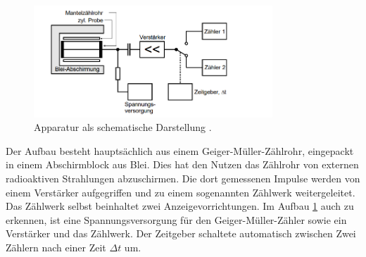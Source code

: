 \begin{figure}
  \centering
  \includegraphics[width=0.8\textwidth]{bilder/Schematische Darstellung des Versuchsaufbaus.png}
  \caption{Apparatur als schematische Darstellung \cite{skript}.}
  \label{fig:aufbau}
\end{figure}
Der Aufbau besteht hauptsächlich aus einem Geiger-Müller-Zählrohr, eingepackt in einem Abschirmblock aus Blei. Dies hat den Nutzen das Zählrohr von externen 
radioaktiven Strahlungen abzuschirmen. Die dort gemessenen Impulse werden von einem Verstärker aufgegriffen und zu einem sogenannten Zählwerk weitergeleitet. 
Das Zählwerk selbst beinhaltet zwei Anzeigevorrichtungen. 
Im Aufbau \ref{fig:aufbau} auch zu erkennen, ist eine Spannungsversorgung für den Geiger-Müller-Zähler sowie ein Verstärker und das Zählwerk. 
Der Zeitgeber schaltete automatisch zwischen Zwei Zählern nach einer Zeit $\Delta t$ um.

